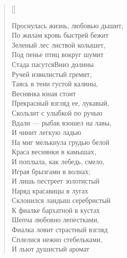 \settowidth{\versewidth}{Проснулась жизнь, любовью дышит,}
\begin{verse}[\versewidth]
\begin{altverse}
Проснулась жизнь, любовью дышит,\\
    По жилам кровь быстрей бежит\ldotst\\
Зеленый лес листвой колышет,\\
    Под пенье птиц вокруг шумит\ldotst\\
Стада пасутся\ldotst Вниз долины\\
    Ручей извилистый гремит,\\
Таясь в тени густой калины,\\
     Веснянка юная стоит\ldotst\\
Прекрасный взгляд ее, лукавый,\\
    Скользит с улыбкой по ручью\ldotst\\
Вдали --- рыбак взошел на лавы,\\
    И чинит легкую ладью\ldotst\\
На миг мелькнула грудью белой\\
    Краса веснянки в камышах,\\
И поплыла, как лебедь, смело,\\
    Играя брызгами в волнах;\\
И лишь пестреет золотистый\\
    Наряд красавицы в лугах\ldotst\\
Склонился ландыш серебристый\\
    К фиалке бархатной в кустах\ldotst\\
Шепча любовно лепестками,\\
    Фиалка ловит страстный взгляд\ldotst\\
Сплелися нежно стебельками,\\
    И льют душистый аромат\ldotst
\end{altverse}
\end{verse}

